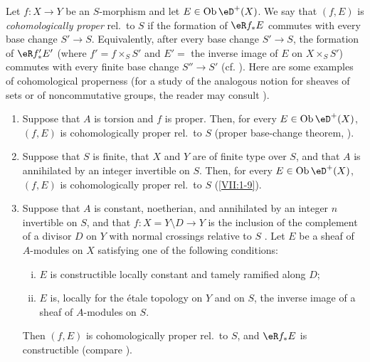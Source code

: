Let $f:X\to Y$ be an $S$-morphism and let $E\in\ob\eD^+(X)$. We say that
$(f,E)$ is \emph{cohomologically proper} rel.\ to $S$ if the formation of
$\eR f_\ast E$ commutes with every base change $S'\to S$. Equivalently, after
every base change $S'\to S$, the formation of $\eR f_\ast' E'$ (where
$f'=f\times_S S'$ and $E'=$ the inverse image of $E$ on $X\times_S S'$)
commutes with every finite base change $S'' \to S'$ (cf.
\cite[XII 6.1]{sga4}). Here are some examples of cohomological properness
(for a study of the analogous notion for sheaves of sets or of
noncommutative groups, the reader may consult \cite[XIII]{sga1}).
\begin{enumerate} %
  \item Suppose that $A$ is torsion and $f$ is proper. Then, for every
    $E\in\ob\eD^+(X)$, $(f,E)$ is cohomologically proper rel.\ to $S$
    (proper base-change theorem, \cite[XII 5.1]{sga4}).
  \item Suppose that $S$ is finite, that $X$ and $Y$ are of finite type over
    $S$, and that $A$ is annihilated by an integer invertible on $S$. Then,
    for every $E\in\ob\eD^+(X)$, $(f,E)$ is cohomologically proper rel.\ to
    $S$ (\ref{VII:1-9}).
  \item Suppose that $A$ is constant, noetherian, and annihilated by an
    integer $n$ invertible on $S$, and that
    $f:X=Y\setminus D\to Y$ is the inclusion of the complement of a divisor
    $D$ on $Y$ with normal crossings relative to $S$
    \cite[XIII 2.1]{sga1}. Let $E$ be a sheaf of $A$-modules on $X$ satisfying
    one of the following conditions:
    \begin{enumerate}[(i)]
      \item $E$ is constructible locally constant and tamely ramified along
        $D$;
      \item $E$ is, locally for the étale topology on $Y$ and on $S$, the
        inverse image of a sheaf of $A$-modules on $S$.
    \end{enumerate}
    Then $(f,E)$ is cohomologically proper rel.\ to $S$, and $\eR f_\ast E$
    is constructible (compare \cite[XIII 2.4]{sga1}).
\end{enumerate} 

